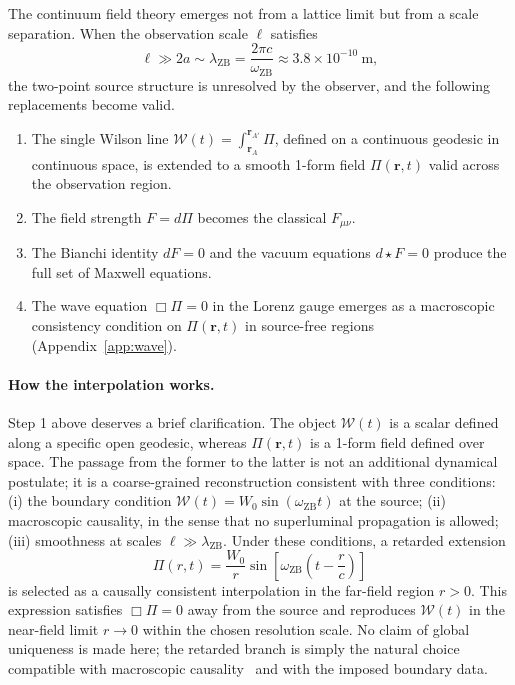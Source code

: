 \documentclass[%
 reprint, amsmath,amssymb, aps, prb, ]{revtex4-2}
\numberwithin{equation}{section}
\newcommand{\omZB}{\omega_{\text{ZB}}}
\newcommand{\WL}{\mathcal{W}}
\newcommand{\hodge}{\star}
\begin{document}
The continuum field theory emerges not from a lattice limit but from a scale separation. When the observation scale $\ell$ satisfies
\begin{equation}
\ell \gg 2a \sim \lambda_{\text{ZB}} = \frac{2\pi c}{\omZB} \approx 3.8\times10^{-10}~\text{m},
\label{eq:limit}
\end{equation}
the two-point source structure is unresolved by the observer, and the following replacements become valid.
\begin{enumerate}
\item The single Wilson line $\WL(t) = \int_{\mathbf{r}_A}^{\mathbf{r}_{A'}}\Pi$, defined on a continuous geodesic in continuous space, is extended to a smooth 1-form field $\Pi(\mathbf{r},t)$ valid across the observation region.
\item The field strength $F = d\Pi$ becomes the classical $F_{\mu\nu}$.
\item The Bianchi identity $dF=0$ and the vacuum equations $d{\hodge}F=0$ produce the full set of Maxwell equations.
\item The wave equation $\Box\Pi = 0$ in the Lorenz gauge emerges as a macroscopic consistency condition on $\Pi(\mathbf{r},t)$ in source-free regions (Appendix~\ref{app:wave}).
\end{enumerate}

\paragraph{How the interpolation works.}
Step 1 above deserves a brief clarification. The object $\WL(t)$ is a scalar defined along a specific open geodesic, whereas $\Pi(\mathbf{r},t)$ is a 1-form field defined over space. The passage from the former to the latter is not an additional dynamical postulate; it is a coarse-grained reconstruction consistent with three conditions: (i) the boundary condition $\WL(t)=W_0\sin(\omZB t)$ at the source; (ii) macroscopic causality, in the sense that no superluminal propagation is allowed; (iii) smoothness at scales $\ell \gg \lambda_{\text{ZB}}$. Under these conditions, a retarded extension
\begin{equation}
\Pi(r,t) = \frac{W_0}{r}\sin\!\left[\omZB\!\left(t-\frac{r}{c}\right)\right]
\label{eq:retarded}
\end{equation}
is selected as a causally consistent interpolation in the far-field region $r>0$. This expression satisfies $\Box\Pi=0$ away from the source and reproduces $\WL(t)$ in the near-field limit $r\to0$ within the chosen resolution scale. No claim of global uniqueness is made here; the retarded branch is simply the natural choice compatible with macroscopic causality~\cite{Jackson1998} and with the imposed boundary data.
\end{document}
